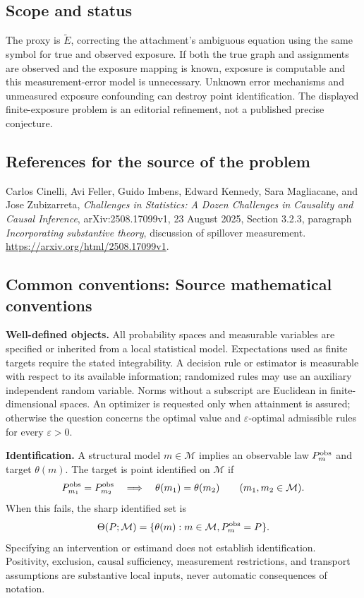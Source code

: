 \documentclass[11pt,a4paper]{article}
\begin{document}
\subsection*{Scope and status}
The proxy is $\widetilde E$, correcting the attachment's ambiguous equation using the same symbol for true and observed exposure. If both the true graph and assignments are observed and the exposure mapping is known, exposure is computable and this measurement-error model is unnecessary. Unknown error mechanisms and unmeasured exposure confounding can destroy point identification. The displayed finite-exposure problem is an editorial refinement, not a published precise conjecture.
\subsection*{References for the source of the problem}
Carlos Cinelli, Avi Feller, Guido Imbens, Edward Kennedy, Sara Magliacane, and Jose Zubizarreta, \emph{Challenges in Statistics: A Dozen Challenges in Causality and Causal Inference}, arXiv:2508.17099v1, 23 August 2025, Section 3.2.3, paragraph \emph{Incorporating substantive theory}, discussion of spillover measurement. \url{https://arxiv.org/html/2508.17099v1}.

\subsection*{Common conventions: Source mathematical conventions}

\textbf{Well-defined objects.}
All probability spaces and measurable variables are specified or inherited
from a local statistical model. Expectations used as finite targets require
the stated integrability. A decision rule or estimator is measurable with
respect to its available information; randomized rules may use an auxiliary
independent random variable. Norms without a subscript are Euclidean in
finite-dimensional spaces. An optimizer is requested only when attainment
is assured; otherwise the question concerns the optimal value and
$\varepsilon$-optimal admissible rules for every $\varepsilon>0$.

\textbf{Identification.}
A structural model $m\in\mathcal M$ implies an observable law
$P_m^{\rm obs}$ and target $\theta(m)$. The target is point identified on
$\mathcal M$ if
\[
 P_{m_1}^{\rm obs}=P_{m_2}^{\rm obs}
 \quad\Longrightarrow\quad\theta(m_1)=\theta(m_2)
 \qquad(m_1,m_2\in\mathcal M).
\]
When this fails, the sharp identified set is
\[
 \Theta(P;\mathcal M)=\{\theta(m):m\in\mathcal M,
                                  P_m^{\rm obs}=P\}.
\]
Specifying an intervention or estimand does not establish identification.
Positivity, exclusion, causal sufficiency, measurement restrictions, and
transport assumptions are substantive local inputs, never automatic
consequences of notation.
\end{document}
